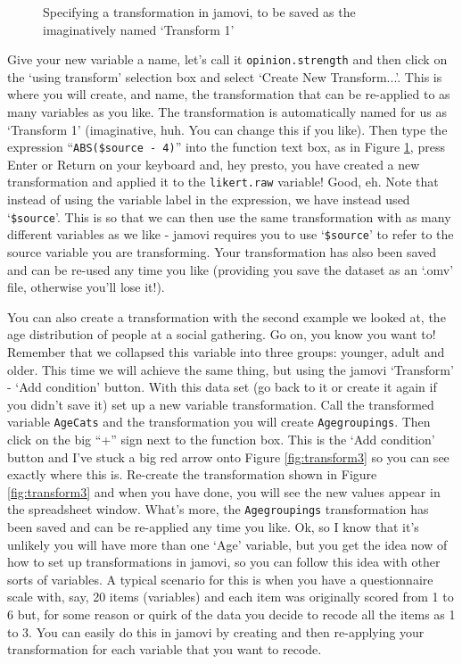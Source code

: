 \begin{figure}[!!htb]
\begin{center}
\caption{Specifying a transformation in jamovi, to be saved as the imaginatively named `Transform 1'}
\label{fig:transform2}
\end{center}
\end{figure}

Give your new variable a name, let's call it \texttt{opinion.strength} and then click on the `using transform' selection box and select `Create New Transform...'. This is where you will create, and name, the transformation that can be re-applied to as many variables as you like. The transformation is automatically named for us as `Transform 1' (imaginative, huh. You can change this if you like). Then type the expression ``\texttt{ABS(\$source - 4)}'' into the function text box, as in Figure \ref{fig:transform2}, press Enter or Return on your keyboard and, hey presto, you have created a new transformation and applied it to the \texttt{likert.raw} variable! Good, eh. Note that instead of using the variable label in the expression, we have instead used `\texttt{\$source}'. This is so that we can then use the same transformation with as many different variables as we like - jamovi requires you to use `\texttt{\$source}' to refer to the source variable you are transforming.  Your transformation has also been saved and can be re-used any time you like (providing you save the dataset as an `.omv' file, otherwise you'll lose it!).

You can also create a transformation with the second example we looked at, the age distribution of people at a social gathering. Go on, you know you want to! Remember that we collapsed this variable into three groups: younger, adult and older. This time we will achieve the same thing, but using the jamovi `Transform' - `Add condition' button. With this data set (go back to it or create it again if you didn't save it) set up a new variable transformation. Call the transformed variable \texttt{AgeCats} and the transformation you will create \texttt{Agegroupings}. Then click on the big ``+'' sign next to the function box. This is the `Add condition' button and I've stuck a big red arrow onto Figure \ref{fig:transform3} so you can see exactly where this is. Re-create the transformation shown in Figure \ref{fig:transform3} and when you have done, you will see the new values appear in the spreadsheet window. What's more, the \texttt{Agegroupings} transformation has been saved and can be re-applied any time you like. Ok, so I know that it's unlikely you will have more than one `Age' variable, but you get the idea now of how to set up transformations in jamovi, so you can follow this idea with other sorts of variables. A typical scenario for this is when you have a questionnaire scale with, say, 20 items (variables) and each item was originally  scored from 1 to 6 but, for some reason or quirk of the data you decide to recode all the items as 1 to 3. You can easily do this in jamovi by creating and then re-applying your transformation for each variable that you want to recode.  

